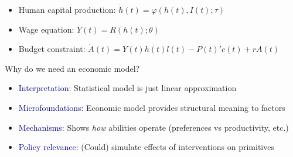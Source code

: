\documentclass[aspectratio=169]{beamer}
\begin{document}
\begin{frame}


\bigskip


\bigskip


\begin{itemize}
\itemsep1.5em
\item<4-> Human capital production: $\dot{h}(t) = \varphi(h(t), I(t); \tau)$
\item<5-> Wage equation: $Y(t) = R(h(t); \theta)$
\item<6-> Budget constraint: $\dot{A}(t) = Y(t)h(t)l(t) - P(t)'c(t) + rA(t)$
\end{itemize}

\end{frame}



\begin{frame}
Why do we need an economic model?
\bigskip

\begin{itemize}
\itemsep1.5em
\item<2-> \textcolor{navy}{Interpretation:} Statistical model is just linear approximation
\item<3-> \textcolor{navy}{Microfoundations:} Economic model provides structural meaning to factors
\item<4-> \textcolor{navy}{Mechanisms:} Shows \emph{how} abilities operate (preferences vs productivity, etc.)
\item<5-> \textcolor{navy}{Policy relevance:} (Could) simulate effects of interventions on primitives
\end{itemize}

\end{frame}
\end{document}
